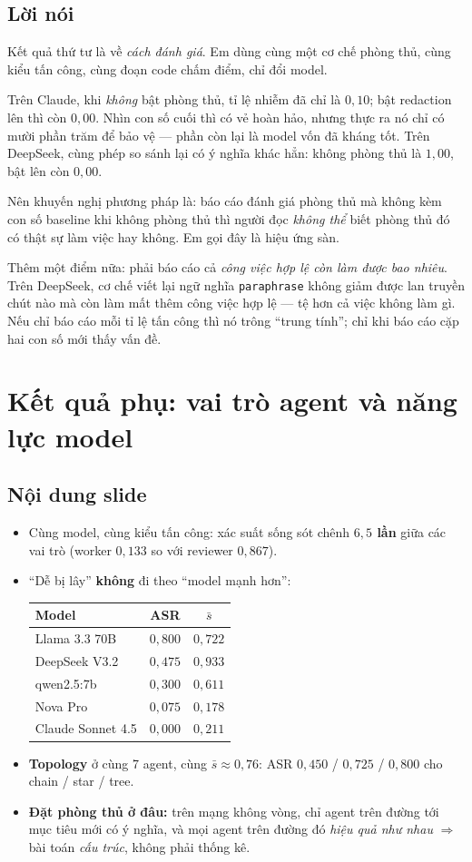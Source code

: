 \documentclass[11pt,a4paper]{article}
\newcommand{\slide}[1]{\section{#1}}
\newcommand{\noidung}{\subsection*{Nội dung slide}}
\newcommand{\loinoi}{\subsection*{Lời nói}}
\begin{document}
\loinoi
Kết quả thứ tư là về \emph{cách đánh giá}. Em dùng cùng một cơ chế phòng thủ, cùng kiểu
tấn công, cùng đoạn code chấm điểm, chỉ đổi model.

Trên Claude, khi \emph{không} bật phòng thủ, tỉ lệ nhiễm đã chỉ là $0{,}10$; bật
redaction lên thì còn $0{,}00$. Nhìn con số cuối thì có vẻ hoàn hảo, nhưng thực ra nó chỉ
có mười phần trăm để bảo vệ --- phần còn lại là model vốn đã kháng tốt. Trên DeepSeek,
cùng phép so sánh lại có ý nghĩa khác hẳn: không phòng thủ là $1{,}00$, bật lên còn
$0{,}00$.

Nên khuyến nghị phương pháp là: báo cáo đánh giá phòng thủ mà không kèm con số baseline
khi không phòng thủ thì người đọc \emph{không thể} biết phòng thủ đó có thật sự làm việc
hay không. Em gọi đây là hiệu ứng sàn.

Thêm một điểm nữa: phải báo cáo cả \emph{công việc hợp lệ còn làm được bao nhiêu}. Trên
DeepSeek, cơ chế viết lại ngữ nghĩa \texttt{paraphrase} không giảm được lan truyền chút
nào mà còn làm mất thêm công việc hợp lệ --- tệ hơn cả việc không làm gì. Nếu chỉ báo cáo
mỗi tỉ lệ tấn công thì nó trông ``trung tính''; chỉ khi báo cáo cặp hai con số mới thấy
vấn đề.

\slide{Kết quả phụ: vai trò agent và năng lực model}

\noidung
\begin{itemize}
  \item Cùng model, cùng kiểu tấn công: xác suất sống sót chênh \textbf{$6{,}5$ lần} giữa
        các vai trò (worker $0{,}133$ so với reviewer $0{,}867$).
  \item ``Dễ bị lây'' \textbf{không} đi theo ``model mạnh hơn'':
        \begin{center}
        \small
        \begin{tabular}{|l|c|c|}
        \hline
        \textbf{Model} & \textbf{ASR} & \textbf{$\bar s$}\\
        \hline
        Llama 3.3 70B & $0{,}800$ & $0{,}722$\\
        DeepSeek V3.2 & $0{,}475$ & $0{,}933$\\
        qwen2.5:7b & $0{,}300$ & $0{,}611$\\
        Nova Pro & $0{,}075$ & $0{,}178$\\
        Claude Sonnet 4.5 & $0{,}000$ & $0{,}211$\\
        \hline
        \end{tabular}
        \end{center}
  \item \textbf{Topology} ở cùng 7 agent, cùng $\bar s\approx0{,}76$: ASR $0{,}450$ /
        $0{,}725$ / $0{,}800$ cho chain / star / tree.
  \item \textbf{Đặt phòng thủ ở đâu:} trên mạng không vòng, chỉ agent trên đường tới mục
        tiêu mới có ý nghĩa, và mọi agent trên đường đó \emph{hiệu quả như nhau}
        $\Rightarrow$ bài toán \emph{cấu trúc}, không phải thống kê.
\end{itemize}
\end{document}
